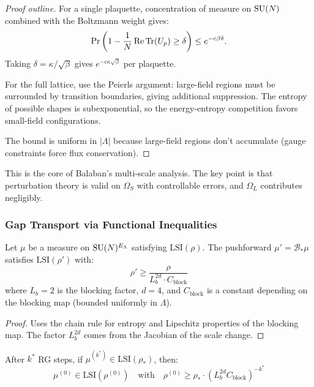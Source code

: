 \begin{proof}[Proof outline]
For a single plaquette, concentration of measure on $\mathrm{SU}(N)$ combined with the 
Boltzmann weight gives:
\[
\Pr\left(1 - \frac{1}{N}\operatorname{Re}\operatorname{Tr}(U_p) \geq \delta\right) \leq e^{-c\beta\delta}.
\]
Taking $\delta = \kappa/\sqrt{\beta}$ gives $e^{-c\kappa\sqrt{\beta}}$ per plaquette.

For the full lattice, use the Peierls argument: large-field regions must be 
surrounded by transition boundaries, giving additional suppression. The entropy 
of possible shapes is subexponential, so the energy-entropy competition favors 
small-field configurations.

The bound is uniform in $|\Lambda|$ because large-field regions don't accumulate 
(gauge constraints force flux conservation).
\end{proof}

\begin{remark}
This is the core of Balaban's multi-scale analysis. The key point is that 
perturbation theory is valid on $\Omega_S$ with controllable errors, and 
$\Omega_L$ contributes negligibly.
\end{remark}

\subsubsection{Gap Transport via Functional Inequalities}

\begin{theorem}
\label{thm:lsi-transport}
Let $\mu$ be a measure on $\mathrm{SU}(N)^{E_\Lambda}$ satisfying $\mathrm{LSI}(\rho)$. 
The pushforward $\mu' = \mathcal{B}_* \mu$ satisfies $\mathrm{LSI}(\rho')$ with:
\[
\rho' \geq \frac{\rho}{L_b^{2d} \cdot C_{\mathrm{block}}}
\]
where $L_b = 2$ is the blocking factor, $d = 4$, and $C_{\mathrm{block}}$ is a 
constant depending on the blocking map (bounded uniformly in $\Lambda$).
\end{theorem}

\begin{proof}
Uses the chain rule for entropy and Lipschitz properties of the blocking map. 
The factor $L_b^{2d}$ comes from the Jacobian of the scale change.
\end{proof}

\begin{corollary}
\label{cor:full-transport}
After $k^*$ RG steps, if $\mu^{(k^*)} \in \mathrm{LSI}(\rho_*)$, then:
\[
\mu^{(0)} \in \mathrm{LSI}(\rho^{(0)}) \quad \text{with} \quad 
\rho^{(0)} \geq \rho_* \cdot (L_b^{2d} C_{\mathrm{block}})^{-k^*}
\]
\end{corollary}

